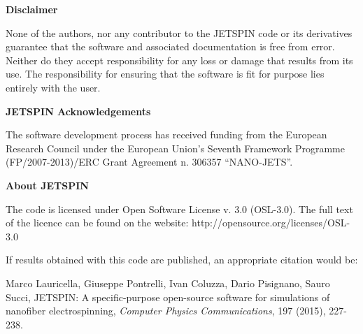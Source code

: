 \documentclass[oneside,english]{book}
\begin{document}
\newpage{}

\vspace*{3cm}

\begin{center}
\textbf{\Large{}{}Disclaimer}{\Large{} }
\par\end{center}{\Large \par}

\bigskip{}

None of the authors, nor any contributor to the JETSPIN code or its
derivatives guarantee that the software and associated documentation
is free from error. Neither do they accept responsibility for any
loss or damage that results from its use. The responsibility for ensuring
that the software is fit for purpose lies entirely with the user.

\newpage{}

\vspace*{3cm}

\begin{center}
\textbf{\Large{}{}JETSPIN Acknowledgements}{\Large{} }
\par\end{center}{\Large \par}

\bigskip{}

\begin{center}
The software development process has received funding from the European
Research Council under the European Union's Seventh Framework Programme
(FP/2007-2013)/ERC Grant Agreement n. 306357 ``NANO-JETS''. 
\par\end{center}

\newpage{}

\vspace*{3cm}

\begin{center}
\textbf{\Large{}{}About JETSPIN}{\Large{} }
\par\end{center}{\Large \par}

\bigskip{}

The code is licensed under Open Software License v. 3.0 (OSL-3.0).
The full text of the licence can be found on the website: http://opensource.org/licenses/OSL-3.0

If results obtained with this code are published, an appropriate citation
would be:

Marco Lauricella, Giuseppe Pontrelli, Ivan Coluzza, Dario Pisignano,
Sauro Succi, JETSPIN: A specific-purpose open-source software for
simulations of nanofiber electrospinning, \textit{Computer Physics
Communications}, 197 (2015), 227-238.
\end{document}
